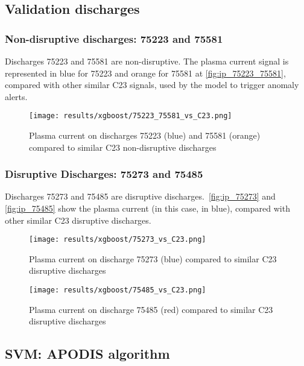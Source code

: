 \subsection{Validation discharges}

\subsubsection{Non-disruptive discharges: 75223 and 75581}

Discharges 75223 and 75581 are non-disruptive. The plasma current signal is represented in blue for 75223 and orange for 75581 at \autoref{fig:ip_75223_75581}, compared with other similar C23 signals, used by the model to trigger anomaly alerts.

\begin{figure}[H]
    \centering
    \texttt{[image: results/xgboost/75223\_75581\_vs\_C23.png]}
    \caption{Plasma current on discharges 75223 (blue) and 75581 (orange) compared to similar C23 non-disruptive discharges}
    \label{fig:ip_75223_75581}
\end{figure}

\subsubsection{Disruptive Discharges: 75273 and 75485}

Discharges 75273 and 75485 are disruptive discharges.\ \autoref{fig:ip_75273} and \autoref{fig:ip_75485} show the plasma current (in this case, in blue), compared with other similar C23 disruptive discharges.

\begin{figure}[H]
    \centering
    \texttt{[image: results/xgboost/75273\_vs\_C23.png]}
    \caption{Plasma current on discharge 75273 (blue) compared to similar C23 disruptive discharges}
    \label{fig:ip_75273}
\end{figure}

\begin{figure}[H]
    \centering
    \texttt{[image: results/xgboost/75485\_vs\_C23.png]}
    \caption{Plasma current on discharge 75485 (red) compared to similar C23 disruptive discharges}
    \label{fig:ip_75485}
\end{figure}

\subsection{\acs{SVM}: \acs{APODIS} algorithm}

